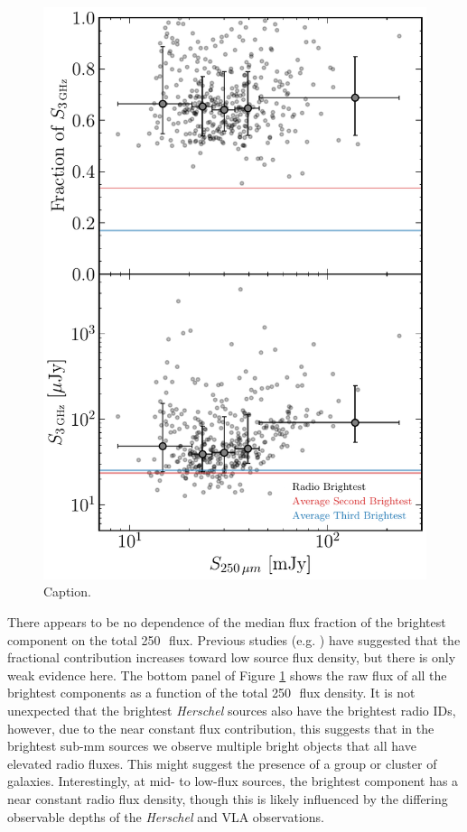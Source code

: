 \begin{figure}
	\centering
	\includegraphics[width=0.75\columnwidth]{Figures/multiples_flux_contribution.pdf}
	\caption{{\color{red} Caption.}}
	\label{fig:multiples_flux_contribution}
\end{figure}

There appears to be no dependence of the median flux fraction of the brightest component on the total 250\,\micron\ flux. Previous studies (e.g. \citealt{Scudder_2016}) have suggested that the fractional contribution increases toward low source flux density, but there is only weak evidence here. The bottom panel of Figure \ref{fig:multiples_flux_contribution} shows the raw flux of all the brightest components as a function of the total 250\,\micron\ flux density. It is not unexpected that the brightest \textit{Herschel} sources also have the brightest radio IDs, however, due to the near constant flux contribution, this suggests that in the brightest sub-mm sources we observe multiple bright objects that all have elevated radio fluxes. This might suggest the presence of a group or cluster of galaxies. Interestingly, at mid- to low-flux sources, the brightest component has a near constant radio flux density, though this is likely influenced by the differing observable depths of the \textit{Herschel} and VLA observations.

